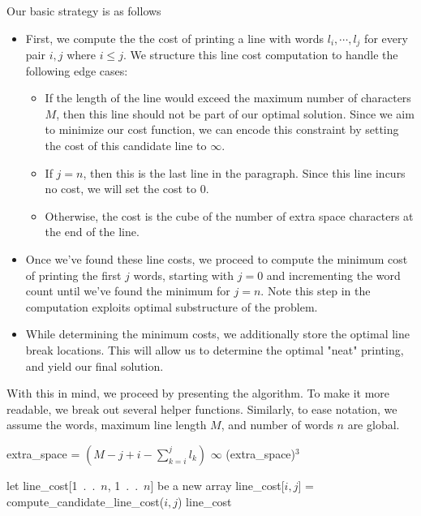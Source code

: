 \documentclass[paper=a4, fontsize=11pt]{scrartcl} %
\numberwithin{equation}{section} %
\numberwithin{figure}{section} %
\numberwithin{table}{section} %
\begin{document}
Our basic strategy is as follows
\begin{itemize}
\item First, we compute the the cost of printing a line with words $l_i, \cdots, l_j$ for every pair $i, j$ where $i \leq j$. We structure this line cost computation to handle the following edge cases:
\begin{itemize}
\item If the length of the line would exceed the maximum number of characters $M$, then this line should not be part of our optimal solution. Since we aim to minimize our cost function, we can encode this constraint by setting the cost of this candidate line to $\infty$.
\item If $j = n$, then this is the last line in the paragraph. Since this line incurs no cost, we will set the cost to 0.
\item Otherwise, the cost is the cube of the number of extra space characters at the end of the line.
\end{itemize}
\item Once we've found these line costs, we proceed to compute the minimum cost of printing the first $j$ words, starting with $j = 0$ and incrementing the word count until we've found the minimum for $j = n$. Note this step in the computation exploits optimal substructure of the problem.
\item While determining the minimum costs, we additionally store the optimal line break locations. This will allow us to determine the optimal "neat" printing, and yield our final solution.
\end{itemize}

With this in mind, we proceed by presenting the algorithm. To make it more readable, we break out several helper functions. Similarly, to ease notation, we assume the words, maximum line length $M$, and number of words $n$ are global.\\

\begin{algorithmic}
\State extra\_space = $(M - j + i - \sum_{k = i}^j l_k)$
	\State \Return $\infty$
	\State {}
\Else
	\State \Return (extra\_space)$^3$
\EndIf
\EndFunction
\end{algorithmic}

\begin{algorithmic}
\State let line\_cost[1~.~.~$n$, 1~.~.~$n$] be a new array
		\State line\_cost[$i,j$] = compute\_candidate\_line\_cost($i, j$)
	\EndFor
\EndFor
\State \Return line\_cost
\EndFunction
\end{algorithmic}
\end{document}

